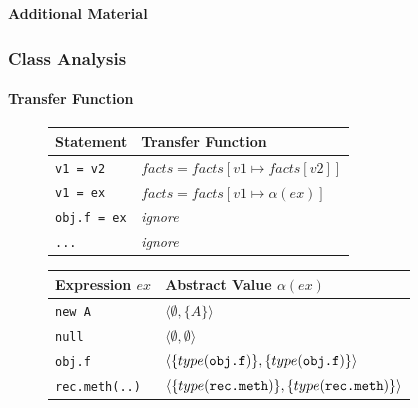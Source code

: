 \documentclass[hyperref={pdfpagelabels=false}]{beamer}
\begin{document}

\begin{frame}
\end{frame}


\begin{frame}
    \begin{center}
        \textbf{Additional Material}
    \end{center}
\end{frame}


\begin{frame}[fragile]
    \frametitle{Class Analysis}
    \framesubtitle{Transfer Function}

    \begin{figure}
        \begin{tabular}{ l | l }
            Statement             & Transfer Function\\
            \hline
            \verb/v1 = v2/        & $facts = facts[v1 \mapsto facts[v2]]$ \\
            \verb/v1 = ex/        & $facts = facts[v1 \mapsto \alpha(ex)]$ \\
            \verb/obj.f = ex/     & \emph{ignore} \\
            \verb/.../            & \emph{ignore} \\
        \end{tabular}
    \end{figure}

    \begin{figure}
        \begin{tabular}{ l | l }
            Expression $ex$       & Abstract Value $\alpha(ex)$\\
            \hline
            \verb/new A/          & $\langle \emptyset, \{ A \} \rangle$ \\
            \verb/null/           & $\langle \emptyset, \emptyset \rangle$ \\
            \verb/obj.f/          & $\langle\{type(\verb/obj.f/)\}, \{type(\verb/obj.f/)\} \rangle$ \\
            \verb/rec.meth(..)/   & $\langle\{type(\verb/rec.meth/)\}, \{type(\verb/rec.meth/)\} \rangle$ \\
        \end{tabular}
    \end{figure}
\end{frame}
\end{document}

